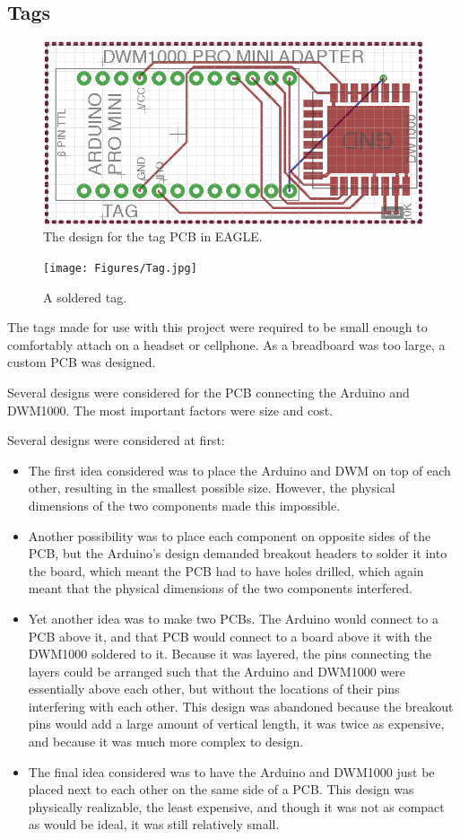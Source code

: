 \subsection{Tags}
\begin{figure}
	\centering
	\includegraphics[width=\linewidth]{Figures/PCB.png}
	\decoRule
	\caption{The design for the tag PCB in EAGLE.}
	\label{fig:PCB}
\end{figure}

\begin{figure}
	\centering
	\texttt{[image: Figures/Tag.jpg]}
	\decoRule
	\caption{A soldered tag.}
	\label{fig:Tag}
\end{figure}
The tags made for use with this project were required to be small enough to comfortably attach on a headset or cellphone. As a breadboard was too large, a custom PCB was designed.

Several designs were considered for the PCB connecting the Arduino and DWM1000. The most important factors were size and cost.

Several designs were considered at first:
\begin{itemize}
	\item The first idea considered was to place the Arduino and DWM on top of each other, resulting in the smallest possible size. However, the physical dimensions of the two components made this impossible. 
	\item Another possibility was to place each component on opposite sides of the PCB, but the Arduino's design demanded breakout headers to solder it into the board, which meant the PCB had to have holes drilled, which again meant that the physical dimensions of the two components interfered.
	\item Yet another idea was to make two PCBs. The Arduino would connect to a PCB above it, and that PCB would connect to a board above it with the DWM1000 soldered to it. Because it was layered, the pins connecting the layers could be arranged such that the Arduino and DWM1000 were essentially above each other, but without the locations of their pins interfering with each other. This design was abandoned because the breakout pins would add a large amount of vertical length, it was twice as expensive, and because it was much more complex to design.
	\item The final idea considered was to have the Arduino and DWM1000 just be placed next to each other on the same side of a PCB. This design was physically realizable, the least expensive, and though it was not as compact as would be ideal, it was still relatively small.
\end{itemize}

